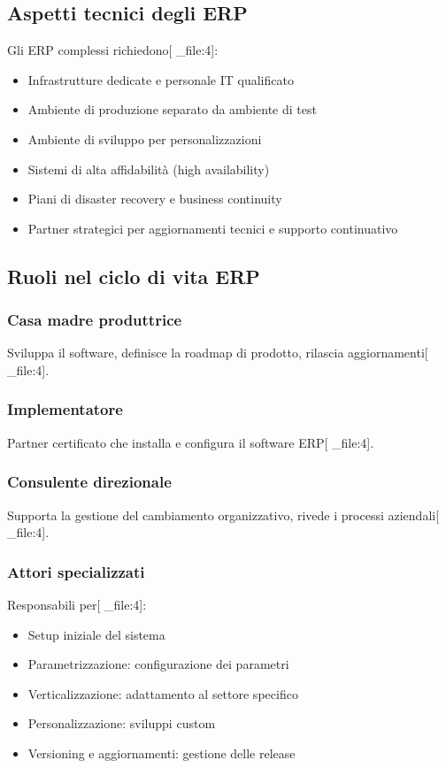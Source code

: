 \documentclass[12pt,a4paper]{article}
\begin{document}
\subsection{Aspetti tecnici degli ERP}
Gli ERP complessi richiedono[ _file:4]:
\begin{itemize}
    \item Infrastrutture dedicate e personale IT qualificato
    \item Ambiente di produzione separato da ambiente di test
    \item Ambiente di sviluppo per personalizzazioni
    \item Sistemi di alta affidabilità (high availability)
    \item Piani di disaster recovery e business continuity
    \item Partner strategici per aggiornamenti tecnici e supporto continuativo
\end{itemize}

\subsection{Ruoli nel ciclo di vita ERP}

\subsubsection{Casa madre produttrice}
Sviluppa il software, definisce la roadmap di prodotto, rilascia aggiornamenti[ _file:4].

\subsubsection{Implementatore}
Partner certificato che installa e configura il software ERP[ _file:4].

\subsubsection{Consulente direzionale}
Supporta la gestione del cambiamento organizzativo, rivede i processi aziendali[ _file:4].

\subsubsection{Attori specializzati}
Responsabili per[ _file:4]:
\begin{itemize}
    \item Setup iniziale del sistema
    \item Parametrizzazione: configurazione dei parametri
    \item Verticalizzazione: adattamento al settore specifico
    \item Personalizzazione: sviluppi custom
    \item Versioning e aggiornamenti: gestione delle release
\end{itemize}
\end{document}
